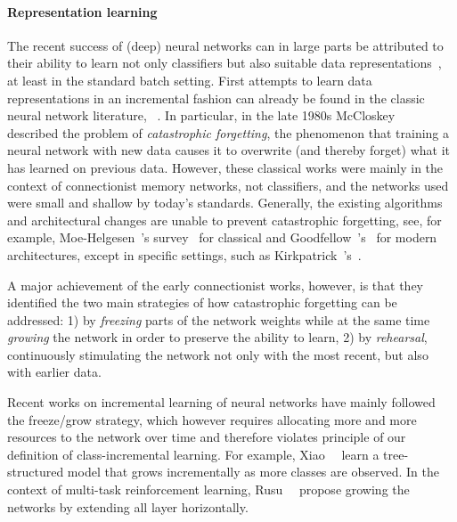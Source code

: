 \documentclass[10pt,twocolumn,letterpaper]{article}
\begin{document}
\paragraph{Representation learning\onedot}
The recent success of (deep) neural networks can in large 
parts be attributed to their ability to learn not only 
classifiers but also suitable data representations~\cite{bengio2013representation, Li2016, misra2016cross,saxena2016convolutional}, 
at least in the standard batch setting.
First attempts to learn data representations in an incremental
fashion can already be found in the classic neural network
literature, \eg~\cite{ans1997avoiding,french1993,french1999catastrophic,robins95}. 
In particular, in the late 1980s \mbox{McCloskey}~\etal~\cite{mccloskey1989catastrophic} 
described the problem of \emph{catastrophic forgetting}, 
\ie the phenomenon that training a neural network with 
new data causes it to overwrite (and thereby forget) 
what it has learned on previous data.
However, these classical works were mainly in the context of 
connectionist memory networks, not classifiers, and the 
networks used were small and shallow by today's standards. 
Generally, the existing algorithms and architectural changes 
are unable to prevent catastrophic forgetting, see, for example, Moe-Helgesen~\etal's survey~\cite{moe2005catastophic} 
for classical and Goodfellow~\etal's~\cite{goodfellow14empirical} 
for modern architectures, except in specific settings, such as Kirkpatrick~\etal's~\cite{kirkpatrick2017overcoming}. 

A major achievement of the early connectionist works, however, is 
that they identified the two main strategies of how catastrophic 
forgetting can be addressed: 1) by \emph{freezing} parts of the 
network weights while at the same time \emph{growing} 
the network in order to preserve the 
ability to learn, 2) by \emph{rehearsal}, \ie continuously stimulating 
the network not only with the most recent, but also with earlier data.

Recent works on incremental learning of neural networks have mainly 
followed the freeze/grow strategy, which however requires allocating 
more and more resources to the network over time and therefore 
violates principle  
of our definition of class-incremental learning.
For example, Xiao~\etal~\cite{xiao2014error} learn a tree-structured 
model that grows incrementally as more classes are observed. 
In the context of multi-task reinforcement learning, 
Rusu~\etal~\cite{rusu2016progressive} propose growing the 
networks by extending all layer horizontally.
\end{document}
